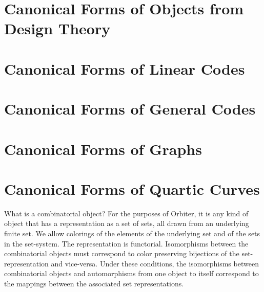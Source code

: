 \bigskip


\clearpage


\section{Canonical Forms of Objects from Design Theory}
\label{sec:canonical:form:objects:design:theory}





\bigskip


\clearpage


\section{Canonical Forms of Linear Codes}
\label{sec:canonical:form:objects:linear:codes}





\bigskip


\clearpage

\section{Canonical Forms of General Codes}
\label{sec:canonical:form:objects:general:codes}





\bigskip


\clearpage




\section{Canonical Forms of Graphs}
\label{sec:canonical:form:objects:graphs}





\bigskip


\clearpage



\section{Canonical Forms of Quartic Curves}
\label{sec:canonical:form:objects:quartic:curvs}





\bigskip


\clearpage




What is a combinatorial object? For the purposes of Orbiter, 
it is any kind of  object that has a representation as a set of sets, 
all drawn from an underlying finite set. 
We allow colorings of the elements of the underlying set and of the sets in the set-system.
The representation is functorial. 
Isomorphisms between the combinatorial objects 
must correspond to color preserving bijections of the set-representation and vice-versa.
Under these conditions, the isomorphisms  between  combinatorial objects and automorphisms from one object to itself 
correspond to the mappings between the associated set representations. 


